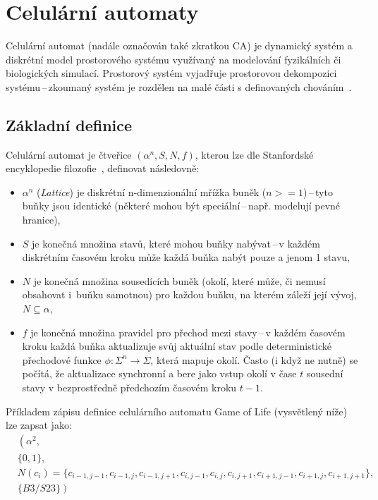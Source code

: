 \section{Celulární automaty}
Celulární automat (nadále označován také zkratkou CA) je dynamický systém a diskrétní model prostorového systému využívaný na modelování fyzikálních či biologických simulací. Prostorový systém vyjadřuje prostorovou dekompozici systému\,--\,zkoumaný systém je rozdělen na malé části s definovaných chováním~\cite{ims}.

\subsection*{Základní definice }
Celulární automat je čtveřice ${(\alpha^{n}, S, N, f)}$, kterou lze dle Stanfordské encyklopedie filozofie~\cite{sep-cellular-automata}, definovat následovně:
\begin{itemize}
    \item ${ \alpha^{n} }$ (\textit{Lattice}) je diskrétní n-dimenzionální mřížka buněk (${ n >= 1 }$)\,--\,tyto buňky jsou identické (některé mohou být speciální\,--\,např. modelují pevné hranice), 
    \item ${ S }$ je konečná množina stavů, které mohou buňky nabývat\,--\,v každém diskrétním časovém kroku může každá buňka nabýt pouze a jenom 1 stavu, 
    \item ${ N }$ je konečná množina sousedících buněk (okolí, které může, či nemusí obsahovat i~buňku samotnou) pro každou buňku, na kterém záleží její vývoj, ${ N \subseteq \alpha }$,
    \item ${ f }$ je konečná množina pravidel pro přechod mezi stavy\,--\,v každém časovém kroku každá buňka aktualizuje svůj aktuální stav podle deterministické přechodové funkce $\phi : \Sigma^n \rightarrow \Sigma$, která mapuje okolí. Často (i když ne nutně) se počítá, že aktualizace synchronní a bere jako vstup okolí v čase $t$ sousední stavy v bezprostředně předchozím časovém kroku $t-1$.
\end{itemize}
Příkladem zápisu definice celulárního automatu Game of Life (vysvětlený níže) lze zapsat jako:
\begin{equation*}
\begin{split}
    & \left( \alpha^{2}, \right. \\
    & \left. \{0, 1\}, \right. \\
    & \left. N(c_i) = \{ c_{i-1,j-1}, c_{i-1,j}, c_{i-1,j+1}, c_{i,j-1}, c_{i,j}, c_{i,j+1}, c_{i+1,j-1}, c_{i+1,j}, c_{i+1,j+1} \}, \right. \\
    & \left. \{B3/S23\} \right)
\end{split}
\end{equation*}


